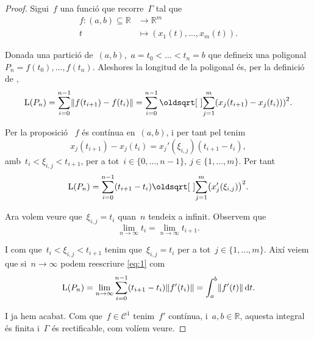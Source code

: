 \documentclass[../../main.tex]{subfiles}
\begin{document}
    \begin{proof}
        Sigui~\(f\) una funció que recorre~\(\Gamma\) tal que
        \begin{align*}
        f\colon(a,b)\subseteq\mathbb{R}&\longrightarrow\mathbb{R}^{m}\\
        t&\longmapsto(x_{1}(t),\dots,x_{m}(t)).
        \end{align*}

        Donada una partició de~\((a,b)\),~\(a=t_{0}<\dots<t_{n}=b\) que defineix una poligonal~\(P_{n}=f(t_{0}),\dots,f(t_{n})\).
        Aleshores la longitud de la poligonal  és, per la definició de ,
        \[
            \Long(P_n)=\sum_{i=0}^{n-1}\norm{f(t_{i+1})-f(t_{i})}=\sum_{i=0}^{n-1}\sqrt{\sum_{j=1}^{m}\left(x_{j}(t_{i+1})-x_{j}(t_{i}))\right)^{2}}.
        \]

        Per la proposició ~\(f\) és contínua en~\((a,b)\), i per tant pel  tenim
        \[
            x_{j}(t_{i+1})-x_{j}(t_{i})=x_{j}'(\xi_{i,j})(t_{i+1}-t_{i}),
        \]
        amb~\(t_{i}<\xi_{i,j}<t_{i+1}\), per a tot~\(i\in\{0,\dots,n-1\},\ j\in\{1,\dots,m\}\).
        Per tant
        \begin{equation}\label{eq:1}
        \Long(P_{n})=\sum_{i=0}^{n-1}(t_{i+1}-t_{i})\sqrt{\sum_{j=1}^{m}\left(x_{j}'(\xi_{i,j})\right)^2}.
        \end{equation}

        Ara volem veure que~\(\xi_{i,j}=t_{i}\) quan~\(n\) tendeix a infinit.
        Observem que
        \[
            \lim_{n\to\infty}t_{i}=\lim_{n\to\infty}t_{i+1}.
        \]

        I com que~\(t_{i}<\xi_{i,j}<t_{i+1}\) tenim que~\(\xi_{i,j}=t_{i}\) per a tot~\(j\in\{1,\dots,m\}\).
        Així veiem que si~\(n\to\infty\) podem reescriure \eqref{eq:1} com
        \begin{displaymath}
        \Long(P_{n})=\lim_{n\to\infty}\sum_{i=0}^{n-1}(t_{i+1}-t_{i})\norm{f'(t_{i})}=\int_{a}^{b}\norm{f'(t)}\diff t.
        \end{displaymath}

        I ja hem acabat.
        Com que~\(f\in\mathcal{C}^{1}\) tenim~\(f'\) contínua, i~\(a,b\in\mathbb{R}\), aquesta integral és finita i~\(\Gamma\) és rectificable, com volíem veure.
    \end{proof}
\end{document}
